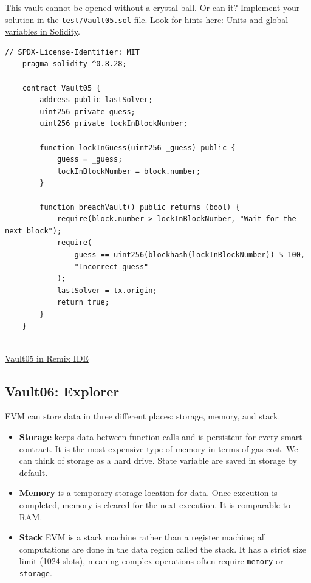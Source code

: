 \documentclass[12pt]{article}
\begin{document}
This vault cannot be opened without a crystal ball. Or can it? Implement your solution in the \texttt{test/Vault05.sol} file. Look for hints here: \href{https://docs.soliditylang.org/en/latest/units-and-global-variables.html}{Units and global variables in Solidity}.

\begin{lstlisting}[language=Solidity]
    // SPDX-License-Identifier: MIT
    pragma solidity ^0.8.28;
    
    contract Vault05 {
        address public lastSolver;
        uint256 private guess;
        uint256 private lockInBlockNumber;
    
        function lockInGuess(uint256 _guess) public {
            guess = _guess;
            lockInBlockNumber = block.number;
        }
    
        function breachVault() public returns (bool) {
            require(block.number > lockInBlockNumber, "Wait for the next block");
            require(
                guess == uint256(blockhash(lockInBlockNumber)) % 100,
                "Incorrect guess"
            );
            lastSolver = tx.origin;
            return true;
        }
    }
    
\end{lstlisting}

\medskip
\noindent
\href{https://remix.ethereum.org/?#activate=solidity&url=https://github.com/radovluk/unbreakable-vault/contracts/Vault05.sol&lang=en&optimize=false&runs=200&evmVersion=null&version=soljson-v0.8.28+commit.7893614a.js}{Vault05 in Remix IDE}

\subsection*{Vault06: Explorer}

EVM can store data in three different places: storage, memory, and stack.

\begin{itemize}
\item \textbf{Storage} keeps data between function calls and is persistent for every smart contract. It is the most expensive type of memory in terms of gas cost. We can think of storage as a hard drive. State variable are saved in storage by default.

\item \textbf{Memory} is a temporary storage location for data. Once execution is completed, memory is cleared for the next execution. It is comparable to RAM.

\item \textbf{Stack} EVM is a stack machine rather than a register machine; all computations are done in the data region called the stack. It has a strict size limit (1024 slots), meaning complex operations often require \texttt{memory} or \texttt{storage}.

\end{itemize}
\end{document}
